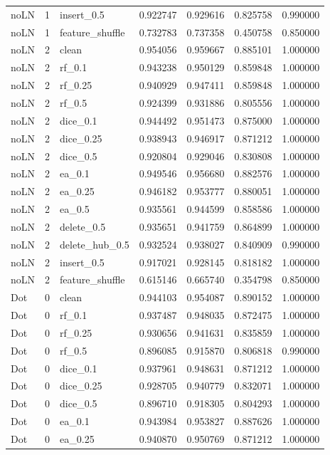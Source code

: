 \documentclass[UTF8,a4paper,11pt,fontset=fandol]{ctexart}
\begin{document}
{\begin{longtable}{lrlrrrr}
noLN & 1 & insert\_0.5 & 0.922747 & 0.929616 & 0.825758 & 0.990000 \\
noLN & 1 & feature\_shuffle & 0.732783 & 0.737358 & 0.450758 & 0.850000 \\
noLN & 2 & clean & 0.954056 & 0.959667 & 0.885101 & 1.000000 \\
noLN & 2 & rf\_0.1 & 0.943238 & 0.950129 & 0.859848 & 1.000000 \\
noLN & 2 & rf\_0.25 & 0.940929 & 0.947411 & 0.859848 & 1.000000 \\
noLN & 2 & rf\_0.5 & 0.924399 & 0.931886 & 0.805556 & 1.000000 \\
noLN & 2 & dice\_0.1 & 0.944492 & 0.951473 & 0.875000 & 1.000000 \\
noLN & 2 & dice\_0.25 & 0.938943 & 0.946917 & 0.871212 & 1.000000 \\
noLN & 2 & dice\_0.5 & 0.920804 & 0.929046 & 0.830808 & 1.000000 \\
noLN & 2 & ea\_0.1 & 0.949546 & 0.956680 & 0.882576 & 1.000000 \\
noLN & 2 & ea\_0.25 & 0.946182 & 0.953777 & 0.880051 & 1.000000 \\
noLN & 2 & ea\_0.5 & 0.935561 & 0.944599 & 0.858586 & 1.000000 \\
noLN & 2 & delete\_0.5 & 0.935651 & 0.941759 & 0.864899 & 1.000000 \\
noLN & 2 & delete\_hub\_0.5 & 0.932524 & 0.938027 & 0.840909 & 0.990000 \\
noLN & 2 & insert\_0.5 & 0.917021 & 0.928145 & 0.818182 & 1.000000 \\
noLN & 2 & feature\_shuffle & 0.615146 & 0.665740 & 0.354798 & 0.850000 \\
Dot & 0 & clean & 0.944103 & 0.954087 & 0.890152 & 1.000000 \\
Dot & 0 & rf\_0.1 & 0.937487 & 0.948035 & 0.872475 & 1.000000 \\
Dot & 0 & rf\_0.25 & 0.930656 & 0.941631 & 0.835859 & 1.000000 \\
Dot & 0 & rf\_0.5 & 0.896085 & 0.915870 & 0.806818 & 0.990000 \\
Dot & 0 & dice\_0.1 & 0.937961 & 0.948631 & 0.871212 & 1.000000 \\
Dot & 0 & dice\_0.25 & 0.928705 & 0.940779 & 0.832071 & 1.000000 \\
Dot & 0 & dice\_0.5 & 0.896710 & 0.918305 & 0.804293 & 1.000000 \\
Dot & 0 & ea\_0.1 & 0.943984 & 0.953827 & 0.887626 & 1.000000 \\
Dot & 0 & ea\_0.25 & 0.940870 & 0.950769 & 0.871212 & 1.000000 \\

\end{longtable}}
\end{document}
